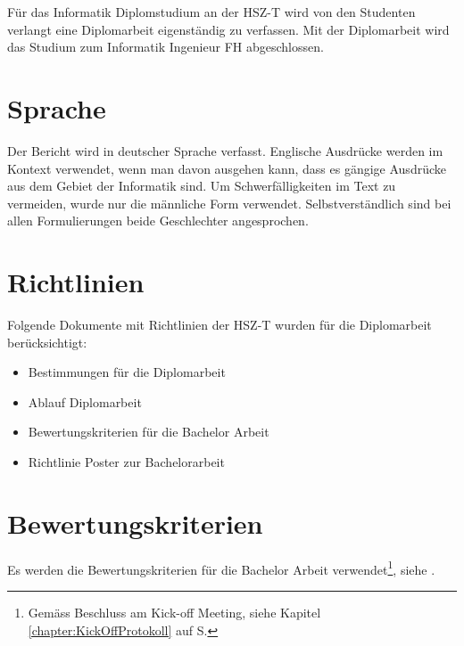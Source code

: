   Für das Informatik Diplomstudium an der \ac{HSZ-T} wird von den Studenten
  verlangt eine Diplomarbeit eigenständig zu verfassen. Mit der Diplomarbeit
  wird das Studium zum Informatik Ingenieur FH abgeschlossen.
  
  \section{Sprache}
  
  Der Bericht wird in deutscher Sprache verfasst. Englische Ausdrücke werden im
  Kontext verwendet, wenn man davon ausgehen kann, dass es gängige Ausdrücke aus
  dem Gebiet der Informatik sind. Um Schwerfälligkeiten im Text zu vermeiden,
  wurde nur die männliche Form verwendet. Selbstverständlich sind bei allen
  Formulierungen beide Geschlechter angesprochen.
    
  \section{Richtlinien}
  Folgende Dokumente mit Richtlinien der \ac{HSZ-T} wurden für die Diplomarbeit
  berücksichtigt:

  \begin{itemize}
      \item Bestimmungen für die Diplomarbeit \cite{hsz_reglement}
      \item Ablauf Diplomarbeit \cite{hsz_ablauf}
      \item Bewertungskriterien für die Bachelor Arbeit
      \cite{hsz_bewertungskriterien}
      \item Richtlinie Poster zur Bachelorarbeit \cite{hsz_poster}
  \end{itemize} 
    
  \section{Bewertungskriterien}
  
  Es werden die Bewertungskriterien für die Bachelor Arbeit
  verwendet\footnote{Gemäss Beschluss am Kick-off Meeting, siehe Kapitel
  \ref{chapter:KickOffProtokoll}  auf S.
  \pageref{chapter:KickOffProtokoll}}, siehe \cite{hsz_bewertungskriterien}.
